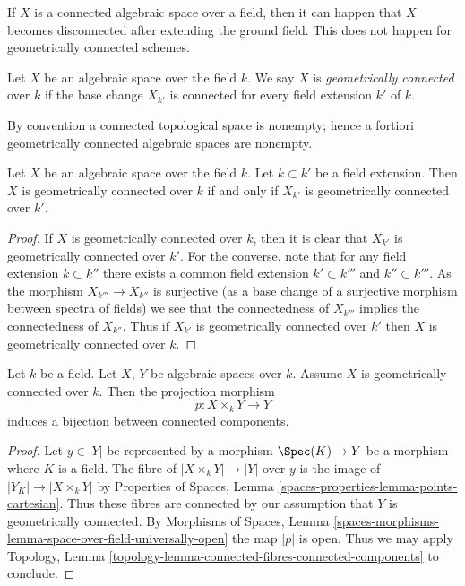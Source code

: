 \noindent
If $X$ is a connected algebraic space over a field, then it can happen that
$X$ becomes disconnected after extending the ground field. This does not
happen for geometrically connected schemes.

\begin{definition}
\label{definition-geometrically-connected}
Let $X$ be an algebraic space over the field $k$. We say $X$ is
{\it geometrically connected} over $k$ if the base change $X_{k'}$
is connected for every field extension $k'$ of $k$.
\end{definition}

\noindent
By convention a connected topological space is nonempty; hence a fortiori
geometrically connected algebraic spaces are nonempty.

\begin{lemma}
\label{lemma-geometrically-connected-check-after-extension}
Let $X$ be an algebraic space over the field $k$.
Let $k \subset k'$ be a field extension.
Then $X$ is geometrically connected over $k$ if and only if
$X_{k'}$ is geometrically connected over $k'$.
\end{lemma}

\begin{proof}
If $X$ is geometrically connected over $k$, then it is clear that
$X_{k'}$ is geometrically connected over $k'$. For the converse, note
that for any field extension $k \subset k''$ there exists a common
field extension $k' \subset k'''$ and $k'' \subset k'''$. As the
morphism $X_{k'''} \to X_{k''}$ is surjective (as a base change of
a surjective morphism between spectra of fields) we see that the
connectedness of $X_{k'''}$ implies the connectedness of $X_{k''}$.
Thus if $X_{k'}$ is geometrically connected over $k'$ then
$X$ is geometrically connected over $k$.
\end{proof}

\begin{lemma}
\label{lemma-bijection-connected-components}
Let $k$ be a field. Let $X$, $Y$ be algebraic spaces over $k$.
Assume $X$ is geometrically connected over $k$.
Then the projection morphism
$$
p : X \times_k Y \longrightarrow Y
$$
induces a bijection between connected components.
\end{lemma}

\begin{proof}
Let $y \in |Y|$ be represented by a morphism $\Spec(K) \to Y$ be a morphism
where $K$ is a field. The fibre of $|X \times_k Y| \to |Y|$ over $y$
is the image of $|Y_K| \to |X \times_k Y|$ by
Properties of Spaces, Lemma \ref{spaces-properties-lemma-points-cartesian}.
Thus these fibres are connected by our assumption that $Y$ is
geometrically connected. By
Morphisms of Spaces, Lemma
\ref{spaces-morphisms-lemma-space-over-field-universally-open}
the map $|p|$ is open.
Thus we may apply Topology,
Lemma \ref{topology-lemma-connected-fibres-connected-components}
to conclude.
\end{proof}

